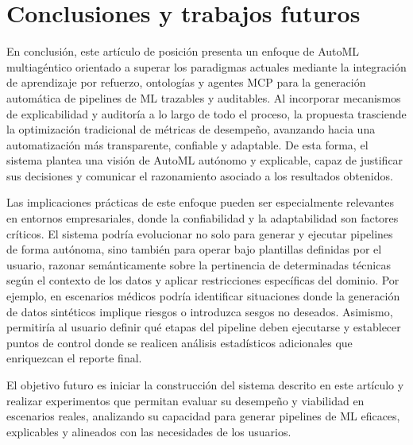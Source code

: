 \documentclass[conference]{IEEEtran}
\begin{document}
\section{Conclusiones y trabajos futuros}

En conclusión, este artículo de posición presenta un enfoque de AutoML multiagéntico orientado a superar los paradigmas actuales mediante la integración de aprendizaje por refuerzo, ontologías y agentes MCP para la generación automática de pipelines de ML trazables y auditables. Al incorporar mecanismos de explicabilidad y auditoría a lo largo de todo el proceso, la propuesta trasciende la optimización tradicional de métricas de desempeño, avanzando hacia una automatización más transparente, confiable y adaptable. De esta forma, el sistema plantea una visión de AutoML autónomo y explicable, capaz de justificar sus decisiones y comunicar el razonamiento asociado a los resultados obtenidos.

Las implicaciones prácticas de este enfoque pueden ser especialmente relevantes en entornos empresariales, donde la confiabilidad y la adaptabilidad son factores críticos. El sistema podría evolucionar no solo para generar y ejecutar pipelines de forma autónoma, sino también para operar bajo plantillas definidas por el usuario, razonar semánticamente sobre la pertinencia de determinadas técnicas según el contexto de los datos y aplicar restricciones específicas del dominio. Por ejemplo, en escenarios médicos podría identificar situaciones donde la generación de datos sintéticos implique riesgos o introduzca sesgos no deseados. Asimismo, permitiría al usuario definir qué etapas del pipeline deben ejecutarse y establecer puntos de control donde se realicen análisis estadísticos adicionales que enriquezcan el reporte final.

El objetivo futuro es iniciar la construcción del sistema descrito en este artículo y realizar experimentos que permitan evaluar su desempeño y viabilidad en escenarios reales, analizando su capacidad para generar pipelines de ML eficaces, explicables y alineados con las necesidades de los usuarios.



\end{document}
